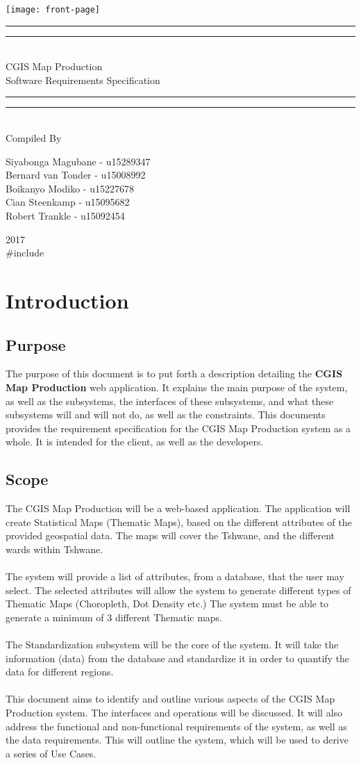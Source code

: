 \documentclass{article}
\newcommand*{\titleGP}{\begingroup
\centering 
\vspace*{\baselineskip}

\rule{\textwidth}{1.6pt}\vspace*{-\baselineskip}\vspace*{2pt}
\rule{\textwidth}{0.4pt}\\[\baselineskip]

{\LARGE CGIS Map Production\\ [0.3\baselineskip] Software Requirements Specification } \\ [0.2\baselineskip]
\rule{\textwidth}{0.4pt}\vspace*{-\baselineskip}\vspace{3.2pt}
\rule{\textwidth}{1.6pt}\\[\baselineskip] %



Compiled By \\[\baselineskip]
{\Large Siyabonga Magubane - u15289347 \\ Bernard van Tonder -  u15008992 \\ Boikanyo Modiko - u15227678 \\ Cian Steenkamp - u15095682 \\ Robert Trankle - u15092454\par} 

\vfill

{\scshape 2017} \\[0.3\baselineskip]
{\large \#include}\par

\endgroup}
\begin{document}
	\begin{center}
		\texttt{[image: front-page]}
	\end{center}
\titleGP

\newpage
\tableofcontents
\listoffigures	
\newpage
	\section{Introduction}
    	
        \subsection{Purpose}
        	{The purpose of this document is to put forth a description detailing the \textbf{CGIS Map Production} web application. It explains the main purpose of the system, as well as the subsystems, the interfaces of these subsystems, and what these subsystems will and will not do, as well as the constraints. This documents provides the requirement specification for the CGIS Map Production system as a whole. It is intended for the client, as well as the developers.}
    	\subsection{Scope}
{The CGIS Map Production will be a web-based application. The application will create Statistical Maps (Thematic Maps), based on the different attributes of the provided geospatial data. The maps will cover the Tshwane, and the different wards within Tshwane.\\\\
The system will provide a list of attributes, from a database, that the user may select. The selected attributes will allow the system to generate different types of Thematic Maps (Choropleth, Dot Density etc.) The system must be able to generate a minimum of 3 different Thematic maps.\\\\
The Standardization subsystem will be the core of the system. It will take the information (data) from the database and standardize it in order to quantify the data for different regions.\\\\
This document aims to identify and outline various aspects of the CGIS Map Production system. The interfaces and operations will be discussed. It will also address the functional and non-functional requirements of the system, as well as the data requirements. This will outline the system, which will be used to derive a series of Use Cases.}
\end{document}
